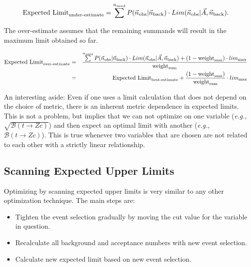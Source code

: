 \begin{equation}
\label{eqn:underestimate}
\text{Expected Limit}_\text{under-estimate} = \sum\limits^{n_\text{used}} P(\xobs|\vec{n}_\text{back})\cdot Lim(\xobs|\vec{A},\vec{n}_\text{back}).
\end{equation}

The over-estimate assumes that the remaining summands will result in
the maximum limit obtained so far.

\begin{eqnarray}
 \text{Expected Limit}_\text{over-estimate} &=& \frac{\sum\limits^{n_\text{used}}
P(\xobs|\vec{n}_\text{back})\cdot Lim(\xobs|\vec{A},\vec{n}_\text{back}) + (1 - \text{weight}_\text{sum}) \cdot lim_\text{max}}{  \text{weight}_\text{sum}} \nonumber\\
\label{eqn:overestimate}
& = & \text{Expected Limit}_\text{best-estimate} + \frac{ (1 - \text{weight}_\text{sum})}{  \text{weight}_\text{sum}} \cdot lim_\text{max}
\end{eqnarray}

An interesting aside: Even if one uses a limit calculation that does
not depend on the choice of metric, there is an inherent metric
dependence in expected limits.  This is not a problem, but implies
that we can not optimize on one variable ({\em e.g.,} $\sqrt{
  {\mathcal B}(t \rightarrow Zc)}$) and then expect an optimal limit
with another ({\em e.g.,} $ {\mathcal B}(t \rightarrow Zc)$).  This is
true whenever two variables that are chosen are not related to each
other with a strictly linear relationship.

\subsection{Scanning Expected Upper Limits}
\label{section:scanexpected}

Optimizing by scanning expected upper limits is very similar to any
other optimization technique.  The main steps are:

\begin{itemize}

  \item Tighten the event selection gradually by moving the cut value
    for the variable in question.

  \item Recalculate all background and acceptance numbers with new
    event selection.

  \item Calculate new expected limit based on new event selection.

\end{itemize}


